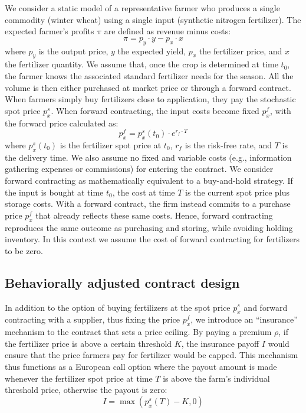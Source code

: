 \documentclass[12pt,a4paper]{article}
\begin{document}
We consider a static model of a representative farmer who produces a single commodity (winter wheat) using a single input (synthetic nitrogen fertilizer). The expected farmer's profits $\pi$ are defined as revenue minus costs:
\begin{equation}
\pi = p_y \cdot y - p_x \cdot x
\label{eq:profit}
\end{equation}
where $p_y$ is the output price, $y$ the expected yield, $p_x$ the fertilizer price, and $x$ the fertilizer quantity. We assume that, once the crop is determined at time $t_0$, the farmer knows the associated standard fertilizer needs for the season. All the volume is then either purchased at market price or through a forward contract. When farmers simply buy fertilizers close to application, they pay the stochastic spot price $p_x^s$. When forward contracting, the input costs become fixed $p_x^f$, with the forward price calculated as:
\begin{equation}
p_x^f = p_x^s(t_0) \cdot e^{r_f \cdot T}
\label{eq:forward}
\end{equation}
where $p_x^s(t_0)$ is the fertilizer spot price at $t_0$, $r_f$ is the risk-free rate, and $T$ is the delivery time. We also assume no fixed and variable costs (e.g., information gathering expenses or commissions) for entering the contract. We consider forward contracting as mathematically equivalent to a buy-and-hold strategy. If the input is bought at time $t_0$, the cost at time $T$ is the current spot price plus storage costs. With a forward contract, the firm instead commits to a purchase price $p_x^f$ that already reflects these same costs. Hence, forward contracting reproduces the same outcome as purchasing and storing, while avoiding holding inventory. In this context we assume the cost of forward contracting for fertilizers to be zero.

\subsection{Behaviorally adjusted contract design}

In addition to the option of buying fertilizers at the spot price $p_x^s$ and forward contracting with a supplier, thus fixing the price $p_x^f$, we introduce an ``insurance'' mechanism to the contract that sets a price ceiling. By paying a premium $\rho$, if the fertilizer price is above a certain threshold $K$, the insurance payoff $I$ would ensure that the price farmers pay for fertilizer would be capped. This mechanism thus functions as a European call option where the payout amount is made whenever the fertilizer spot price at time $T$ is above the farm's individual threshold price, otherwise the payout is zero:
\begin{equation}
I = \max(p_x^s(T) - K, 0)
\label{eq:payoff}
\end{equation}
\end{document}
